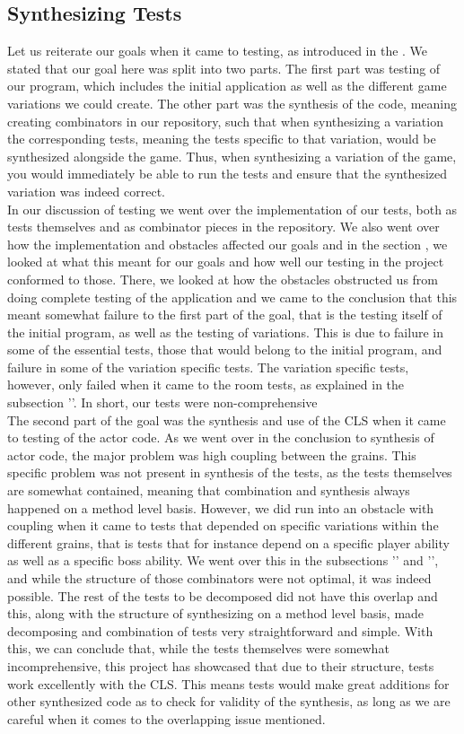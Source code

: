 \subsection{Synthesizing Tests}
Let us reiterate our goals when it came to testing, as introduced in the . We stated that our goal here was split into two parts. The first part was testing of our program, which includes the initial application as well as the different game variations we could create. The other part was the synthesis of the code, meaning creating combinators in our repository, such that when synthesizing a variation the corresponding tests, meaning the tests specific to that variation, would be synthesized alongside the game. Thus, when synthesizing a variation of the game, you would immediately be able to run the tests and ensure that the synthesized variation was indeed correct. \\
In our discussion of testing we went over the implementation of our tests, both as tests themselves and as combinator pieces in the repository. We also went over how the implementation and obstacles affected our goals and in the section , we looked at what this meant for our goals and how well our testing in the project conformed to those. There, we looked at how the obstacles obstructed us from doing complete testing of the application and we came to the conclusion that this meant somewhat failure to the first part of the goal, that is the testing itself of the initial program, as well as the testing of variations. This is due to failure in some of the essential tests, those that would belong to the initial program, and failure in some of the variation specific tests. The variation specific tests, however, only failed when it came to the room tests, as explained in the subsection ''. In short, our tests were non-comprehensive \\
The second part of the goal was the synthesis and use of the CLS when it came to testing of the actor code. As we went over in the conclusion to synthesis of actor code, the major problem was high coupling between the grains. This specific problem was not present in synthesis of the tests, as the tests themselves are somewhat contained, meaning that combination and synthesis always happened on a method level basis. However, we did run into an obstacle with coupling when it came to tests that depended on specific variations within the different grains, that is tests that for instance depend on a specific player ability as well as a specific boss ability. We went over this in the subsections '' and '', and while the structure of those combinators were not optimal, it was indeed possible. The rest of the tests to be decomposed did not have this overlap and this, along with the structure of synthesizing on a method level basis, made decomposing and combination of tests very straightforward and simple. With this, we can conclude that, while the tests themselves were somewhat incomprehensive, this project has showcased that due to their structure, tests work excellently with the CLS. This means tests would make great additions for other synthesized code as to check for validity of the synthesis, as long as we are careful when it comes to the overlapping issue mentioned.
